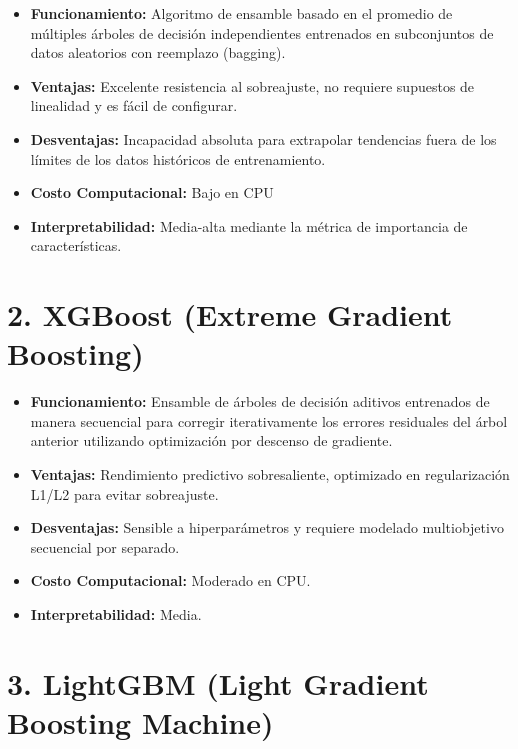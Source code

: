 \documentclass[
  spanish,
  12pt,
]{report}
\providecommand{\tightlist}{%
  \setlength{\itemsep}{0pt}\setlength{\parskip}{0pt}}
\begin{document}
\begin{itemize}
\tightlist
\item
  \textbf{Funcionamiento:} Algoritmo de ensamble basado en el promedio
  de múltiples árboles de decisión independientes entrenados en
  subconjuntos de datos aleatorios con reemplazo (bagging).
\item
  \textbf{Ventajas:} Excelente resistencia al sobreajuste, no requiere
  supuestos de linealidad y es fácil de configurar.
\item
  \textbf{Desventajas:} Incapacidad absoluta para extrapolar tendencias
  fuera de los límites de los datos históricos de entrenamiento.
\item
  \textbf{Costo Computacional:} Bajo en CPU
\item
  \textbf{Interpretabilidad:} Media-alta mediante la métrica de
  importancia de características.
\end{itemize}

\section{2. XGBoost (Extreme Gradient
Boosting)}\label{xgboost-extreme-gradient-boosting}

\begin{itemize}
\tightlist
\item
  \textbf{Funcionamiento:} Ensamble de árboles de decisión aditivos
  entrenados de manera secuencial para corregir iterativamente los
  errores residuales del árbol anterior utilizando optimización por
  descenso de gradiente.
\item
  \textbf{Ventajas:} Rendimiento predictivo sobresaliente, optimizado en
  regularización L1/L2 para evitar sobreajuste.
\item
  \textbf{Desventajas:} Sensible a hiperparámetros y requiere modelado
  multiobjetivo secuencial por separado.
\item
  \textbf{Costo Computacional:} Moderado en CPU.
\item
  \textbf{Interpretabilidad:} Media.
\end{itemize}

\section{3. LightGBM (Light Gradient Boosting
Machine)}\label{lightgbm-light-gradient-boosting-machine}
\end{document}

